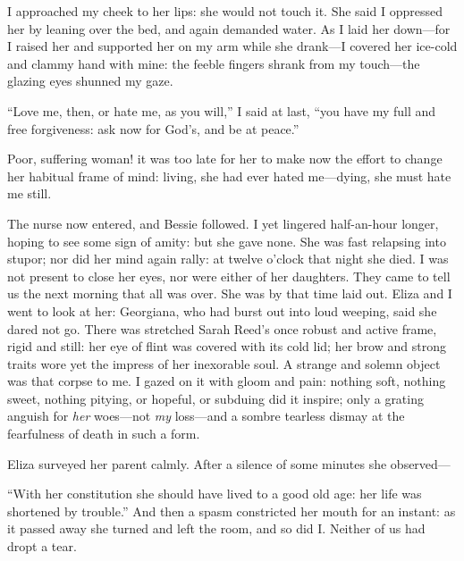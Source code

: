 I approached my cheek to her lips: she would not touch it. She said I
oppressed her by leaning over the bed, and again demanded water. As I
laid her down---for I raised her and supported her on my arm while she
drank---I covered her ice-cold and clammy hand with mine: the feeble
fingers shrank from my touch---the glazing eyes shunned my gaze.

\enquote{Love me, then, or hate me, as you will,} I said at last,
\enquote{you have my full and free forgiveness: ask now for God's, and
	be at peace.}

Poor, suffering woman! it was too late for her to make now the effort to
change her habitual frame of mind: living, she had ever hated
me---dying, she must hate me still.

The nurse now entered, and Bessie followed. I yet lingered half-an-hour
longer, hoping to see some sign of amity: but she gave none. She was
fast relapsing into stupor; nor did her mind again rally: at twelve
o'clock that night she died. I was not present to close her eyes, nor
were either of her daughters. They came to tell us the next morning
that all was over. She was by that time laid out. Eliza and I went to
look at her: Georgiana, who had burst out into loud weeping, said she
dared not go. There was stretched Sarah Reed's once robust and active
frame, rigid and still: her eye of flint was covered with its cold lid;
her brow and strong traits wore yet the impress of her inexorable soul.
A strange and solemn object was that corpse to me. I gazed on it with
gloom and pain: nothing soft, nothing sweet, nothing pitying, or
hopeful, or subduing did it inspire; only a grating anguish for
\emph{her} woes---not \emph{my} loss---and a sombre tearless dismay at
the fearfulness of death in such a form.

Eliza surveyed her parent calmly. After a silence of some minutes she
observed---

\enquote{With her constitution she should have lived to a good old age:
	her life was shortened by trouble.} And then a spasm constricted her
mouth for an instant: as it passed away she turned and left the room,
and so did I\@. Neither of us had dropt a tear.

